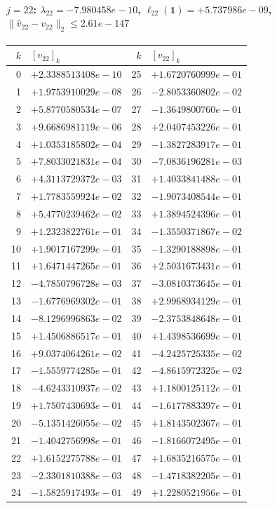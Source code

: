 \documentclass[11pt]{article}
\begin{document}
\paragraph{$j = 22$: $\lambda_{22} = -7.980458e-10$, \quad $\ell_{22}(\mathbf{1}) = +5.737986e-09$, \quad $\|\hat{v}_{22} - v_{22}\|_2 \leq 2.61e-147$}
\begin{center}
{\footnotesize
\begin{tabular}{r@{\;\;}l@{\quad}r@{\;\;}l}
\toprule
$k$ & $[v_{22}]_k$ & $k$ & $[v_{22}]_k$ \\
\midrule
0 & $+2.3388513408e-10$ & 25 & $+1.6720760999e-01$ \\
1 & $+1.9753910029e-08$ & 26 & $-2.8053360802e-02$ \\
2 & $+5.8770580534e-07$ & 27 & $-1.3649800760e-01$ \\
3 & $+9.6686981119e-06$ & 28 & $+2.0407453226e-01$ \\
4 & $+1.0353185802e-04$ & 29 & $-1.3827283917e-01$ \\
5 & $+7.8033021831e-04$ & 30 & $-7.0836196281e-03$ \\
6 & $+4.3113729372e-03$ & 31 & $+1.4033841488e-01$ \\
7 & $+1.7783559924e-02$ & 32 & $-1.9073408544e-01$ \\
8 & $+5.4770239462e-02$ & 33 & $+1.3894524396e-01$ \\
9 & $+1.2323822761e-01$ & 34 & $-1.3550371867e-02$ \\
10 & $+1.9017167299e-01$ & 35 & $-1.3290188898e-01$ \\
11 & $+1.6471447265e-01$ & 36 & $+2.5031673431e-01$ \\
12 & $-4.7850796728e-03$ & 37 & $-3.0810373645e-01$ \\
13 & $-1.6776969302e-01$ & 38 & $+2.9968934129e-01$ \\
14 & $-8.1296996863e-02$ & 39 & $-2.3753848648e-01$ \\
15 & $+1.4506886517e-01$ & 40 & $+1.4398536699e-01$ \\
16 & $+9.0374064261e-02$ & 41 & $-4.2425725335e-02$ \\
17 & $-1.5559774285e-01$ & 42 & $-4.8615972325e-02$ \\
18 & $-4.6243310937e-02$ & 43 & $+1.1800125112e-01$ \\
19 & $+1.7507430693e-01$ & 44 & $-1.6177883397e-01$ \\
20 & $-5.1351426055e-02$ & 45 & $+1.8143502367e-01$ \\
21 & $-1.4042756998e-01$ & 46 & $-1.8166072495e-01$ \\
22 & $+1.6152275788e-01$ & 47 & $+1.6835216575e-01$ \\
23 & $-2.3301810388e-03$ & 48 & $-1.4718382205e-01$ \\
24 & $-1.5825917493e-01$ & 49 & $+1.2280521956e-01$ \\
\bottomrule
\end{tabular}
}
\end{center}
\end{document}
